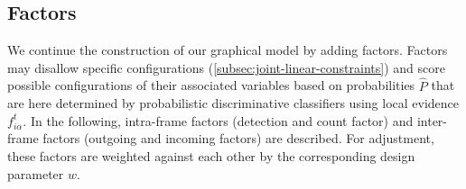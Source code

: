 \subsection{Factors}
We continue the construction of our graphical model by adding factors.
Factors %
may disallow specific configurations (\cf \cref{subsec:joint-linear-constraints}) and score possible
configurations of their associated variables based on
probabilities $\hat{P}$ that are here determined by probabilistic discriminative classifiers using
local evidence $f_{i\alpha}^t$.  In the following, intra-frame factors (detection and count factor)
and inter-frame factors (outgoing and incoming factors) are described. For adjustment, these factors
are weighted against each other by the corresponding design parameter $w$.



